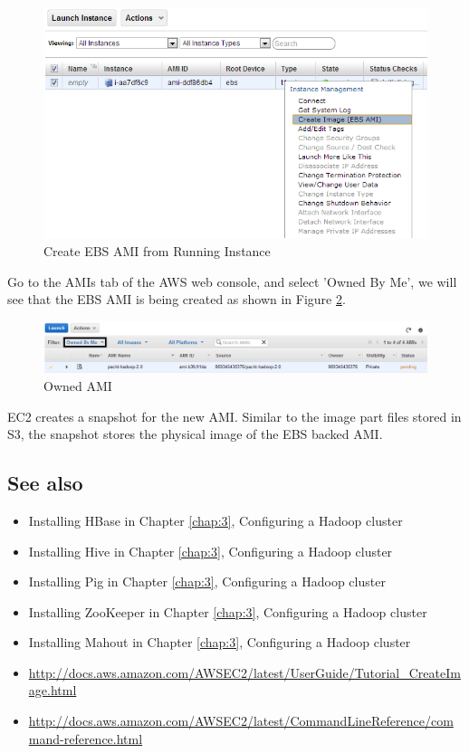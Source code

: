 \begin{figure}[ht]
  \centering
  \includegraphics[width=.9\textwidth]{figs/5163os_08_31.png}
  \caption{Create EBS AMI from Running Instance}\label{fig:aws.create.ebsami}
\end{figure} 
Go to the AMIs tab of the AWS web console, and select 'Owned By Me', we will see that the EBS AMI is being created as shown in Figure \ref{fig:aws.owned.ami}.
\begin{figure}[ht]
  \centering
  \includegraphics[width=.9\textwidth]{figs/5163os_08_33.png}
  \caption{Owned AMI}\label{fig:aws.owned.ami}
\end{figure} 
EC2 creates a snapshot for the new AMI. Similar to the image part files stored in S3, the snapshot stores the physical image of the EBS backed AMI.

\subsection*{See also}
\begin{itemize}
  \item Installing HBase in Chapter \ref{chap:3}, Configuring a Hadoop cluster
  \item Installing Hive in Chapter \ref{chap:3}, Configuring a Hadoop cluster
  \item Installing Pig in Chapter \ref{chap:3}, Configuring a Hadoop cluster
  \item Installing ZooKeeper in Chapter \ref{chap:3}, Configuring a Hadoop cluster
  \item Installing Mahout in Chapter \ref{chap:3}, Configuring a Hadoop cluster
  \item \url{http://docs.aws.amazon.com/AWSEC2/latest/UserGuide/Tutorial_CreateImage.html}
  \item \url{http://docs.aws.amazon.com/AWSEC2/latest/CommandLineReference/command-reference.html}
\end{itemize}

